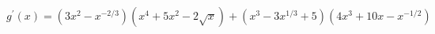 $ \displaystyle g^{\prime}(x) = (3x^2 - x^{-2/3})(x^4 + 5x^2 - 2 \sqrt{x}) + (x^3 - 3x^{1/3} + 5)(4x^3 + 10x - x^{-1/2}) $
